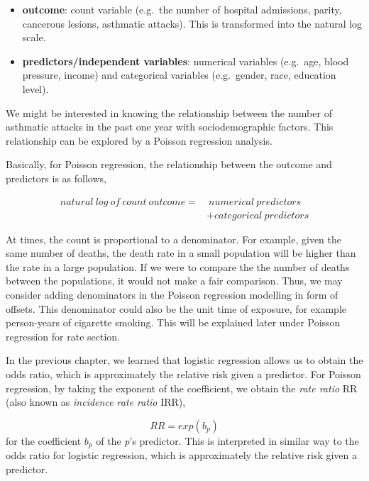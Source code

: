 \documentclass[
  10pt,
]{krantz}
\providecommand{\tightlist}{%
  \setlength{\itemsep}{0pt}\setlength{\parskip}{0pt}}
\begin{document}
\begin{itemize}
\tightlist
\item
  \textbf{outcome}: count variable (e.g.~the number of hospital admissions, parity, cancerous lesions, asthmatic attacks). This is transformed into the natural log scale.
\item
  \textbf{predictors/independent variables}: numerical variables (e.g.~age, blood pressure, income) and categorical variables (e.g.~gender, race, education level).
\end{itemize}

We might be interested in knowing the relationship between the number of asthmatic attacks in the past one year with sociodemographic factors. This relationship can be explored by a Poisson regression analysis.

Basically, for Poisson regression, the relationship between the outcome and predictors is as follows,

\[\begin{aligned}
natural\ log\ of\ count\ outcome = &\ numerical\ predictors \\
& + categorical\ predictors
\end{aligned}\]

At times, the count is proportional to a denominator. For example, given the same number of deaths, the death rate in a small population will be higher than the rate in a large population. If we were to compare the the number of deaths between the populations, it would not make a fair comparison. Thus, we may consider adding denominators in the Poisson regression modelling in form of offsets. This denominator could also be the unit time of exposure, for example person-years of cigarette smoking. This will be explained later under Poisson regression for rate section.

In the previous chapter, we learned that logistic regression allows us to obtain the odds ratio, which is approximately the relative risk given a predictor. For Poisson regression, by taking the exponent of the coefficient, we obtain the \emph{rate ratio} RR (also known as \emph{incidence rate ratio} IRR),

\[RR=exp(b_{p})\]
for the coefficient \(b_p\) of the \emph{p}'s predictor. This is interpreted in similar way to the odds ratio for logistic regression, which is approximately the relative risk given a predictor.
\end{document}
